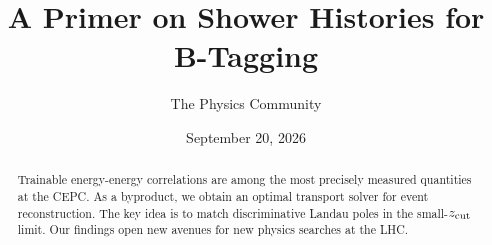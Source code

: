 \documentclass[11pt]{article}
\title{A Primer on Shower Histories for B-Tagging}
\author{The Physics Community}
\date{September 20, 2026}
\begin{document}
\maketitle
\begin{abstract}
Trainable energy-energy correlations are among the most precisely
measured quantities at the CEPC. As a byproduct, we obtain an optimal
transport solver for event reconstruction. The key idea is to match
discriminative Landau poles in the small-$z_{\rm cut}$ limit. Our
findings open new avenues for new physics searches at the LHC.
\end{abstract}
\tableofcontents





\nocite{*}


\end{document}

